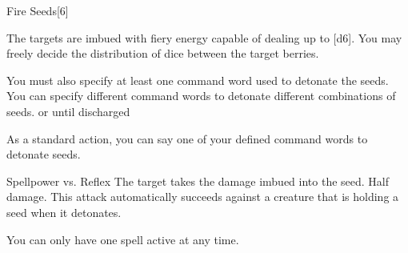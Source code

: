 \begin{spellsection}{Fire Seeds}[6]
    \begin{spellheader}
    \end{spellheader}
    \begin{spellcontent}
        \begin{spelltargetinginfo}
        \end{spelltargetinginfo}
        \begin{spelleffects}
            \spelleffect The targets are imbued with fiery energy capable of dealing up to [d6]. You may freely decide the distribution of dice between the target berries.

            You must also specify at least one command word used to detonate the seeds. You can specify different command words to detonate different combinations of seeds.
            \spelldur \durext or until discharged
        \end{spelleffects}
    \end{spellcontent}
    \begin{spellsubcontent}
        \begin{spelltargetinginfo}
            \spellspecial As a standard action, you can say one of your defined command words to detonate seeds.
            \spellrng{\rngmed}
        \end{spelltargetinginfo}
        \begin{spelleffects}
            \begin{spellattack}{Spellpower vs. Reflex}
                \spellsuccess The target takes the damage imbued into the seed.
                \spellfailure Half damage.
                \spellspecial This attack automatically succeeds against a creature that is holding a seed when it detonates.
            \end{spellattack}
        \end{spelleffects}
    \end{spellsubcontent}
    \begin{spellfooter}
        \spellnotes You can only have one  spell active at any time.
        \miscastexplode
    \end{spellfooter}
\end{spellsection}

